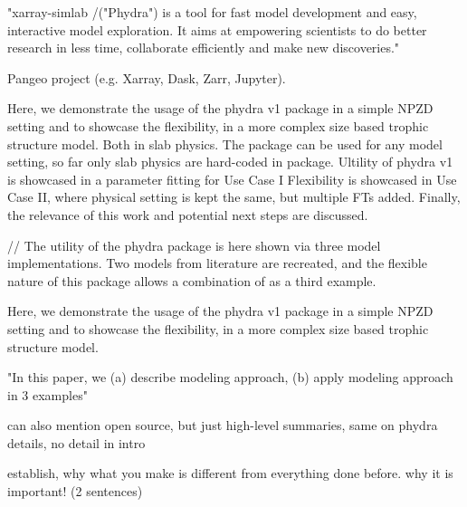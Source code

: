 \documentclass[template.tex]{subfiles}
\begin{document}
"xarray-simlab /("Phydra") is a tool for fast model development and easy, interactive model exploration. It aims at empowering scientists to do better research in less time, collaborate efficiently and make new discoveries."

Pangeo project (e.g. Xarray, Dask, Zarr, Jupyter). 


Here, we demonstrate the usage of the phydra v1 package in a simple NPZD setting and to showcase the flexibility, in a more complex size based trophic structure model. Both in slab physics.
The package can be used for any model setting, so far only slab physics are hard-coded in package.
Ultility of phydra v1 is showcased in a parameter fitting for Use Case I
Flexibility is showcased in Use Case II, where physical setting is kept the same, but multiple FTs added.
Finally, the relevance of this work and potential next steps are discussed.

//
The utility of the phydra package is here shown via three model implementations. Two models from literature are recreated, and the flexible nature of this package allows a combination of as a third example. 

Here, we demonstrate the usage of the phydra v1 package in a simple NPZD setting and to showcase the flexibility, in a more complex size based trophic structure model. 

"In this paper, we (a) describe modeling approach, (b) apply modeling approach in 3 examples"

can also mention open source, but just high-level summaries, same on phydra details, no detail in intro

establish, why what you make is different from everything done before. why it is important! (2 sentences)
\end{document}
